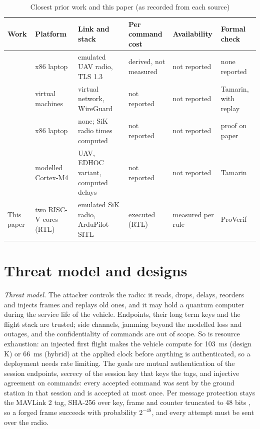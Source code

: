 \documentclass[conference]{IEEEtran}
\begin{document}
\begin{table}[t]
\centering
\caption{Closest prior work and this paper (as recorded from each source)}
\label{tab:rw}
\setlength{\tabcolsep}{2pt}
\footnotesize
\begin{tabular}{llllll}
\toprule
Work & Platform & Link and stack & Per command cost & Availability & Formal check \\
\midrule
\cite{hyoung26} & x86 laptop & emulated UAV radio, TLS 1.3 & derived, not measured & not reported & none reported \\
\cite{pqwg21} & virtual machines & virtual network, WireGuard & not reported & not reported & Tamarin, with replay \\
\cite{ahmed26} & x86 laptop & none; SiK radio times computed & not reported & not reported & proof on paper \\
\cite{meneses26} & modelled Cortex-M4 & UAV, EDHOC variant, computed delays & not reported & not reported & Tamarin \\
This paper & two RISC-V cores (RTL) & emulated SiK radio, ArduPilot SITL & executed (RTL) & measured per rule & ProVerif \\
\bottomrule
\end{tabular}
\end{table}

\section{Threat model and designs}
\label{sec:design}
\emph{Threat model.} The attacker controls the radio: it reads, drops, delays, reorders and injects frames and replays old ones, and it may hold a quantum computer during the service life of the vehicle. Endpoints, their long term keys and the flight stack are trusted; side channels, jamming beyond the modelled loss and outages, and the confidentiality of commands are out of scope. So is resource exhaustion: an injected first flight makes the vehicle compute for 103~ms (design K) or 66~ms (hybrid) at the applied clock before anything is authenticated, so a deployment needs rate limiting. The goals are mutual authentication of the session endpoints, secrecy of the session key that keys the tags, and injective agreement on commands: every accepted command was sent by the ground station in that session and is accepted at most once. Per message protection stays the MAVLink 2 tag, SHA-256 over key, frame and counter truncated to 48 bits \cite{mavsign}, so a forged frame succeeds with probability $2^{-48}$, and every attempt must be sent over the radio.
\end{document}
